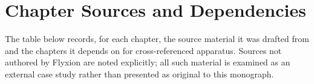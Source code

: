 
\chapter{Chapter Sources and Dependencies}
\label{app:sources}

\noindent The table below records, for each chapter, the source material it was drafted from and the chapters it depends on for cross-referenced apparatus. Sources not authored by Flyxion are noted explicitly; all such material is examined as an external case study rather than presented as original to this monograph.

